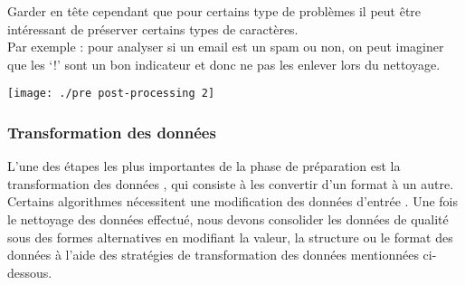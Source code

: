 \documentclass[a4paper, 12pt]{article}
\begin{document}
		Garder en tête cependant que pour certains type de problèmes il peut être intéressant de préserver certains types de caractères.\\
		Par exemple : pour analyser si un email est un spam ou non, on peut imaginer que les ‘!’ sont un bon indicateur et donc ne pas les enlever lors du nettoyage.
		\begin{center}
			\texttt{[image: ./pre post-processing 2]}
		\end{center}
	\subsubsection{Transformation des données}L'une des étapes les plus importantes de la phase de préparation est la transformation des données , qui consiste à les convertir d'un format à un autre. Certains algorithmes nécessitent une modification des données d'entrée .
	Une fois le nettoyage des données effectué, nous devons consolider les données de qualité sous des formes alternatives en modifiant la valeur, la structure ou le format des données à l'aide des stratégies de transformation des données mentionnées ci-dessous. 
\end{document}
